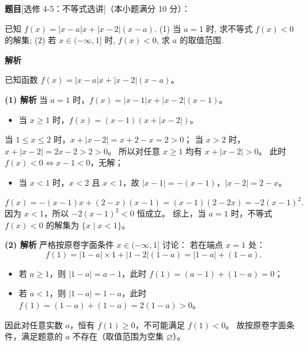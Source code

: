 \begin{answer}


\end{answer}
\begin{answer}

\textbf{题目}[选修 4-5：不等式选讲]（本小题满分 10 分）：

已知 $f(x) = |x - a|x + |x - 2|(x - a)$.
(1) 当 $a = 1$ 时, 求不等式 $f(x) < 0$ 的解集;
(2) 若 $x \in (-\infty, 1]$ 时, $f(x) < 0$, 求 $a$ 的取值范围.

\textbf{解析}

已知函数 $f(x) = |x - a|x + |x - 2|(x - a)$。

\textbf{(1) 解析}
当 $a = 1$ 时，$f(x) = |x - 1|x + |x - 2|(x - 1)$。
\begin{itemize}
\item 当 $x \geqslant 1$ 时，$f(x) = (x - 1)(x + |x - 2|)$。
\end{itemize}
  当 $1 \leqslant x \leqslant 2$ 时，$x + |x - 2| = x + 2 - x = 2 > 0$；
  当 $x > 2$ 时，$x + |x - 2| = 2x - 2 > 2 > 0$。
  所以对任意 $x \geqslant 1$ 均有 $x + |x - 2| > 0$。
  此时 $f(x) < 0 \iff x - 1 < 0$，无解；
\begin{itemize}
\item 当 $x < 1$ 时，$x < 2$ 且 $x < 1$，故 $|x - 1| = -(x - 1)$，$|x - 2| = 2 - x$。
\end{itemize}
\nopagebreak[4]
\[f(x) = -(x - 1)x + (2 - x)(x - 1) = (x - 1)(2 - 2x) = -2(x - 1)^2.\]
  因为 $x < 1$，所以 $-2(x - 1)^2 < 0$ 恒成立。
综上，当 $a = 1$ 时，不等式 $f(x) < 0$ 的解集为 $\{x \mid x < 1\}$。

\textbf{(2) 解析}
严格按原卷字面条件 $x \in (-\infty, 1]$ 讨论：
若在端点 $x = 1$ 处：
\nopagebreak[4]
\[f(1) = |1 - a| \times 1 + |1 - 2|(1 - a) = |1 - a| + (1 - a).\]
\begin{itemize}
\item 若 $a \geqslant 1$，则 $|1 - a| = a - 1$，此时 $f(1) = (a - 1) + (1 - a) = 0$；
\item 若 $a < 1$，则 $|1 - a| = 1 - a$，此时 $f(1) = (1 - a) + (1 - a) = 2(1 - a) > 0$。
\end{itemize}
因此对任意实数 $a$，恒有 $f(1) \geqslant 0$，不可能满足 $f(1) < 0$。
故按原卷字面条件，满足题意的 $a$ 不存在（取值范围为空集 $\varnothing$）。


\end{answer}

